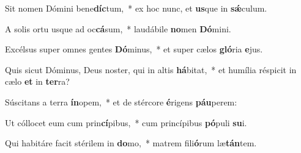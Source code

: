 \item Sit nomen Dómini bene\textbf{díc}tum,~* ex hoc nunc, et \textbf{us}que in \textbf{sǽ}culum.
\item A solis ortu usque ad oc\textbf{cá}sum,~* laudábile \textbf{no}men \textbf{Dó}mini.
\item Excélsus super omnes gentes \textbf{Dó}minus,~* et super cælos \textbf{gló}ria \textbf{e}jus.
\item Quis sicut Dóminus, Deus noster, qui in altis \textbf{há}bitat,~* et humília réspicit in cælo \textbf{et} in \textbf{ter}ra?
\item Súscitans a terra \textbf{ín}opem,~* et de stércore \textbf{é}rigens \textbf{páu}perem:
\item Ut cóllocet eum cum prin\textbf{cí}pibus,~* cum princípibus \textbf{pó}puli \textbf{su}i.
\item Qui habitáre facit stérilem in \textbf{do}mo,~* matrem fili\textbf{ó}rum læ\textbf{tán}tem.
